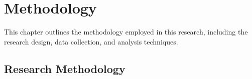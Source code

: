 \chapter{Methodology}
\label{chapter:methodology}

This chapter outlines the methodology employed in this research, including the research design, data collection, and analysis techniques.

\section{Research Methodology}
\label{section:research-methodology}
